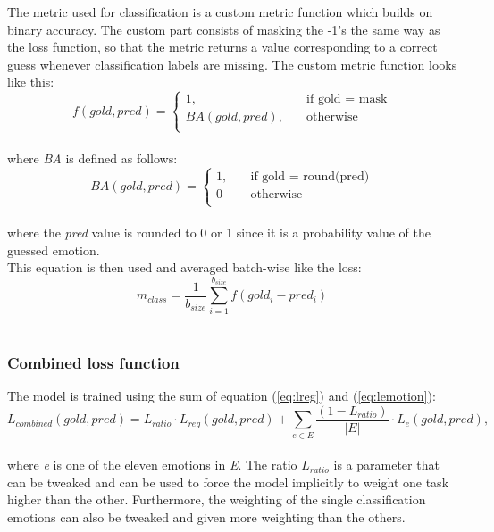 The metric used for classification is a custom metric function which builds on binary accuracy. The custom part consists of masking the -1's the same way as the loss function, so that the metric returns a value corresponding to a correct guess whenever classification labels are missing. The custom metric function looks like this: \\
\begin{equation}
f(gold,pred) =
     \begin{cases}
       1, &\quad\text{if gold = mask}\\
       BA(gold,pred), &\quad\text{otherwise} \\
     \end{cases}
\end{equation}\\
where \textit{BA} is defined as follows: \\
\begin{equation} \label{eq:bin_acc}
BA(gold, pred) =
	\begin{cases}
		1, &\quad\text{if gold = round(pred)} \\
		0 &\quad\text{otherwise} \\
	\end{cases}
\end{equation}\\
where the \textit{pred} value is rounded to 0 or 1 since it is a probability value of the guessed emotion.\\
This equation is then used and averaged batch-wise like the loss: \\
\begin{equation} \label{eq:class_metric}
m_{class}=\dfrac{1}{b_{size}}\sum^{b_{size}}_{i=1}f\left(gold_{i}-pred_{i}\right)
\end{equation}\\

\subsubsection{Combined loss function}
The model is trained using the sum of equation (\ref{eq:lreg}) and (\ref{eq:lemotion}):\\
\begin{equation}
L_{combined}(gold,pred)=L_{ratio}\cdot L_{reg}(gold, pred) +  \sum_{e\in E}\dfrac{(1-L_{ratio})}{|E|}\cdot L_{e}(gold, pred),
\end{equation}\\
where \textit{e} is one of the eleven emotions in \textit{E}. The ratio $L_{ratio}$ is a parameter that can be tweaked and can be used to force the model implicitly to weight one task higher than the other. Furthermore, the weighting of the single classification emotions can also be tweaked and given more weighting than the others.

